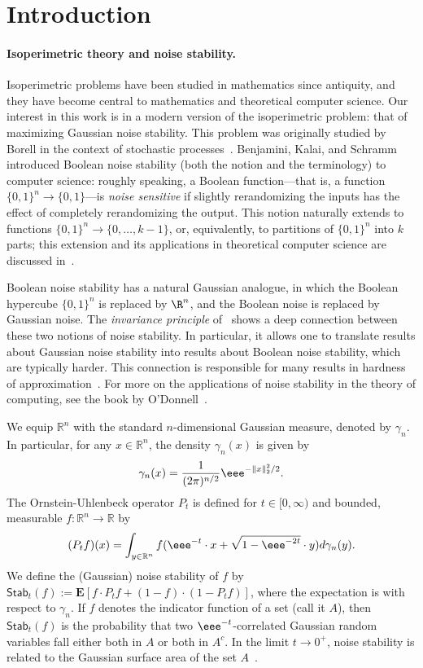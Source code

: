 \documentclass{toc}
\begin{document}
\section{Introduction} 

\paragraph{Isoperimetric theory and noise stability.}
Isoperimetric problems have been studied in mathematics since antiquity, and
they have become central to  mathematics and theoretical computer
science.
Our interest in this work is in a modern version of the isoperimetric problem: that of
maximizing Gaussian noise stability. This problem was originally studied by Borell in
the context of stochastic processes~\cite{Borell:85}.
Benjamini, Kalai, and Schramm~\cite{BKS:99} introduced Boolean noise stability
(both the notion and the terminology) to computer science: roughly speaking, a
Boolean function---that is, a function $\{0, 1\}^n \to \{0, 1\}$---is
\emph{noise sensitive} if slightly rerandomizing the inputs has the effect of
completely rerandomizing the output. This notion naturally extends to functions
$\{0, 1\}^n \to \{0, \dots, k - 1\}$, or, equivalently, to partitions of $\{0,
1\}^n$ into $k$ parts; this extension and its applications in theoretical computer
science
%
are   %
discussed in~\cite{IsakssonMossel:12}.

Boolean noise stability has a natural Gaussian analogue, in which
the Boolean hypercube $\{0, 1\}^n$ is replaced by $\R^n$, and the Boolean
noise is replaced by Gaussian noise.  The \emph{invariance principle} of~\cite{MOO10}
%
shows     %
a deep connection between these two notions of noise
stability. In particular, it allows one to translate results about Gaussian
noise stability into results about Boolean noise stability, which
are typically harder. This connection is responsible for many results
in hardness of approximation~\cite{KKMO07}. For more on the applications of
noise stability in the theory of computing, see the book by O'Donnell~\cite{ODonnell:book}.

We equip $\mathbb{R}^n$ with the standard
$n$-dimensional Gaussian measure, denoted by $\gamma_n$.
In particular, for any $x \in \mathbb{R}^n$, the density $\gamma_n(x)$ is given by 
\[
\gamma_n(x) = \frac{1}{(2\pi)^{n/2}}  \eee^{-{\Vert x \Vert_2
^2}/{2}}.
\]
 The Ornstein-Uhlenbeck operator $P_t$ is defined for $t \in [0, \infty)$ and bounded, measurable $f: \mathbb{R}^n \rightarrow \mathbb{R}$ by
$$
(P_t f)(x) = \int_{y \in \mathbb{R}^n} f(\eee^{-t} \cdot x + \sqrt{1- \eee^{-2t}} \cdot y) d \gamma_n(y).
$$
We define the (Gaussian) noise stability of $f$ by $\mathsf{Stab}_t(f) :=
\mathbf{E}[f \cdot P_t f + (1-f) \cdot (1 - P_t f)]$, where the expectation is with respect to
$\gamma_n$. If $f$ denotes the indicator function of a set (call it
$A$), then $\mathsf{Stab}_t(f)$ is the probability that two
$\eee^{-t}$-correlated Gaussian random variables fall either both in $A$ or both in $A^c$. In
the limit $t \rightarrow 0^+$, noise stability is related to the Gaussian
surface area of the set $A$~\cite{Ledoux:94}.
\end{document}
